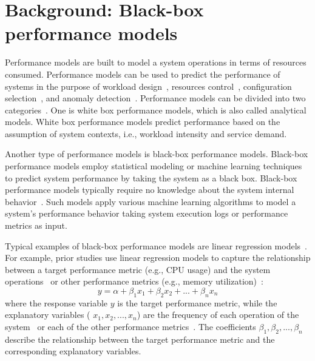 \section{Background: Black-box performance models} \label{sec:background}


Performance models are built to model a system operations in terms of resources consumed. Performance models can be used to predict the performance of systems in the purpose of workload design~\citep{DBLP:journals/tse/KrishnamurthyRM06,DBLP:conf/fast/YadwadkarBGNS10,DBLP:journals/ase/SyerSJH17}, resources control~\citep{DBLP:conf/cnsm/GongGW10,DBLP:conf/sosp/CortezBMRFB17}, configuration selection~\citep{DBLP:conf/kbse/GuoCASW13,DBLP:conf/wosp/ValovPGFC17,DBLP:journals/ese/GuoYSASVCWY18}, and anomaly detection~\citep{DBLP:journals/csur/IbidunmoyeHE15,DBLP:conf/issre/FarshchiSWG15,DBLP:journals/stvr/GhaithWPJOM16}. Performance models can be divided into two categories~\citep{DBLP:conf/wosp/DidonaQRT15}. One is white box performance models, which is also called analytical models. White box performance models predict performance based on the assumption of system contexts, i.e., workload intensity and service demand.

Another type of performance models is black-box performance models. Black-box performance models employ statistical modeling or machine learning techniques to predict system performance by taking the system as a black box.
Black-box performance models typically require no knowledge about the system internal behavior~\citep{DBLP:conf/wosp/DidonaQRT15,DBLP:conf/icst/GaoJBL16}. Such models apply various machine learning algorithms to model a system's performance behavior taking system execution logs or performance metrics as input. 

Typical examples of black-box performance models are linear regression models~\citep{DBLP:conf/wosp/ShangHNF15, Yao:2018:LSL:3184407.3184416}. 
For example, prior studies use linear regression models to capture the relationship between a target performance metric (e.g., CPU usage) and the system operations~\citep{Yao:2018:LSL:3184407.3184416} or other performance metrics (e.g., memory utilization)~\citep{DBLP:conf/wosp/ShangHNF15}:
\begin{equation}
y=\alpha + \beta_1 x_1 + \beta_2 x_2+...+\beta_n x_n
\end{equation}
where the response variable $y$ is the target performance metric, while the explanatory variables ( $x_1,x_2,...,x_n$) are the frequency of each operation of the system~\citep{Yao:2018:LSL:3184407.3184416} or each of the other performance metrics~\citep{DBLP:conf/wosp/ShangHNF15}.
The coefficients $\beta_1,\beta_2,...,\beta_n$ describe the relationship between the target performance metric and the corresponding explanatory variables.  

